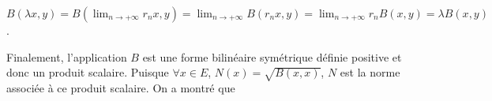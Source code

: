 {{\begin{center}
$B(\lambda x,y) =B(\lim_{n \rightarrow +\infty}r_nx,y)=\lim_{n \rightarrow +\infty}B(r_nx,y)=\lim_{n \rightarrow +\infty}r_nB(x,y)=\lambda B(x,y)$.
\end{center}

Finalement, l'application $B$ est une forme bilinéaire symétrique définie positive et donc un produit scalaire. Puisque $\forall x\in E$, $N(x)=\sqrt{B(x,x)}$, $N$ est la norme associée à ce produit scalaire. On a montré que

\begin{center}
\end{center}
}
}
